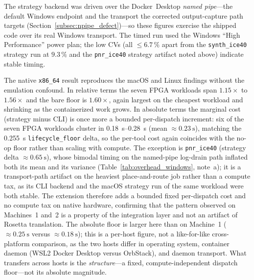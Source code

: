 \begin{table}[H]
\begin{flushleft}
    The strategy backend was driven over the Docker~Desktop \emph{named pipe}---the default Windows endpoint and the transport the corrected output-capture path targets (Section~\ref{subsec:npipe_defect})---so these figures exercise the shipped code over its real Windows transport. The timed run used the Windows ``High Performance'' power plan; the low CVs (all $\le 6.7\,\%$ apart from the \texttt{synth\_ice40} strategy run at $9.3\,\%$ and the \texttt{pnr\_ice40} strategy artifact noted above) indicate stable timing.
    \end{flushleft}
\end{table}

The native \texttt{x86\_64} result reproduces the macOS and Linux findings without the emulation confound. In relative terms the seven FPGA workloads span $1.15\times$ to $1.56\times$ and the bare floor is $1.60\times$, again largest on the cheapest workload and shrinking as the containerized work grows. In absolute terms the marginal cost (strategy minus CLI) is once more a bounded per-dispatch increment: six of the seven FPGA workloads cluster in \SIrange{0.18}{0.28}{\second} (mean $\approx \SI{0.23}{\second}$), matching the \SI{0.255}{\second} \texttt{lifecycle\_floor} delta, so the per-tool cost again coincides with the no-op floor rather than scaling with compute. The exception is \texttt{pnr\_ice40} (strategy delta $\approx \SI{0.65}{\second}$), whose bimodal timing on the named-pipe log-drain path inflated both its mean and its variance (Table~\ref{tab:overhead_windows}, note~a); it is a transport-path artifact on the heaviest place-and-route job rather than a compute tax, as its CLI backend and the macOS strategy run of the same workload were both stable. The extension therefore adds a bounded fixed per-dispatch cost and no compute tax on native hardware, confirming that the pattern observed on Machines~1 and~2 is a property of the integration layer and not an artifact of Rosetta translation. The absolute floor is larger here than on Machine~1 ($\approx \SI{0.25}{\second}$ versus $\approx \SI{0.18}{\second}$); this is a per-host figure, not a like-for-like cross-platform comparison, as the two hosts differ in operating system, container daemon (WSL2 Docker Desktop versus OrbStack), and daemon transport. What transfers across hosts is the \emph{structure}---a fixed, compute-independent dispatch floor---not its absolute magnitude.

